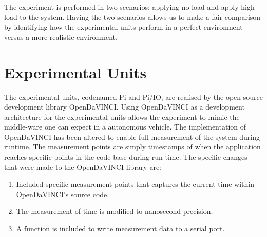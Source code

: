 The experiment is performed in two scenarios: applying no-load and apply high-load to the system. Having the two scenarios allows us to make a fair comparison by identifying how the experimental units perform in a perfect environment versus a more realistic environment. 






\section{Experimental Units}
\label{section:exp-units}

The experimental units, codenamed Pi and Pi/IO, are realised by the open source development library OpenDaVINCI. Using OpenDaVINCI as a development architecture for the experimental units allows the experiment to mimic the middle-ware one can expect in a autonomous vehicle. The implementation of OpenDaVINCI has been altered to enable full measurement of the system during runtime. The measurement points are simply timestamps of when the application reaches specific points in the code base during run-time. The specific changes that were made to the OpenDaVINCI library are: \\

\begin{enumerate}
\item Included specific measurement points that captures the current time within OpenDaVINCI's source code.
\item The measurement of time is modified to nanosecond precision.
\item A function is included to write measurement data to a serial port.\\
\end{enumerate}

